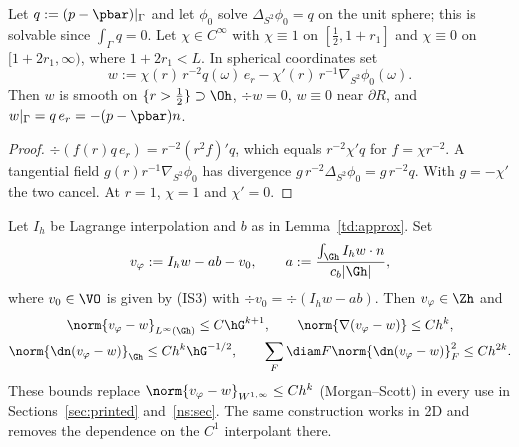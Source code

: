 \begin{lemma}\label{td:w}
Let $q:=(p-\pbar)|_\Gamma$ and let $\phi_0$ solve $\Delta_{S^2}\phi_0=q$ on the unit sphere; this is solvable since $\int_\Gamma q=0$. Let $\chi\in C^\infty$ with $\chi\equiv1$ on $[\tfrac12,1+r_1]$ and $\chi\equiv0$ on $[1+2r_1,\infty)$, where $1+2r_1<L$. In spherical coordinates set
\[
w:=\chi(r)\,r^{-2}q(\omega)\,e_r-\chi'(r)\,r^{-1}\nabla_{S^2}\phi_0(\omega).
\]
Then $w$ is smooth on $\{r>\tfrac12\}\supset\Oh$, $\div w=0$, $w\equiv0$ near $\partial R$, and $w|_\Gamma=q\,e_r=-(p-\pbar)n$.
\end{lemma}

\begin{proof}
$\div(f(r)q\,e_r)=r^{-2}(r^2f)'q$, which equals $r^{-2}\chi'q$ for $f=\chi r^{-2}$. A tangential field $g(r)r^{-1}\nabla_{S^2}\phi_0$ has divergence $g\,r^{-2}\Delta_{S^2}\phi_0=g\,r^{-2}q$. With $g=-\chi'$ the two cancel. At $r=1$, $\chi=1$ and $\chi'=0$.
\end{proof}

\begin{lemma}\label{td:vphi}
Let $I_h$ be Lagrange interpolation and $b$ as in Lemma~\ref{td:approx}. Set
\[
v_\varphi:=I_hw-ab-v_0,\qquad a:=\frac{\int_{\Gh}I_hw\cdot n}{c_b|\Gh|},
\]
where $v_0\in\VO$ is given by (IS3) with $\div v_0=\div(I_hw-ab)$. Then $v_\varphi\in\Zh$ and
\begin{gather*}
\norm{v_\varphi-w}_{L^\infty(\Gh)}\le C\hG^{k+1},\qquad \norm{\nabla(v_\varphi-w)}\le Ch^k,\\
\norm{\dn(v_\varphi-w)}_{\Gh}\le Ch^k\hG^{-1/2},\qquad \sum_F\diam F\norm{\dn(v_\varphi-w)}^2_F\le Ch^{2k}.
\end{gather*}
These bounds replace $\norm{v_\varphi-w}_{W^{1,\infty}}\le Ch^k$ (Morgan--Scott) in every use in Sections~\ref{sec:printed} and~\ref{ns:sec}. The same construction works in 2D and removes the dependence on the $C^1$ interpolant there.
\end{lemma}

